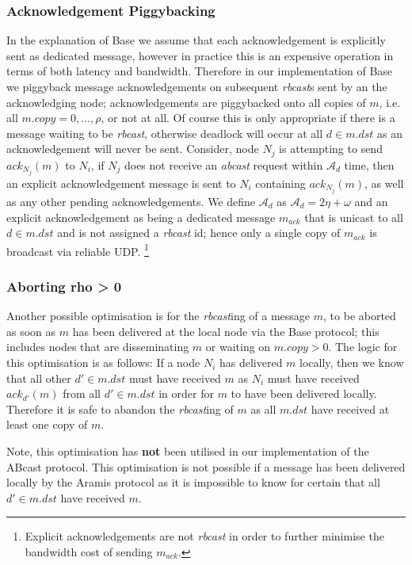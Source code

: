    \subsubsection*{Acknowledgement Piggybacking}\label{ssec:base_ack_piggyback}
    In the explanation of \textsf{Base} we assume that each acknowledgement is explicitly sent as dedicated message, however in practice this is an expensive operation in terms of both latency and bandwidth.  Therefore in our implementation of \textsf{Base} we piggyback message acknowledgements on subsequent \emph{rbcast}s sent by an the acknowledging node; acknowledgements are piggybacked onto all copies of $m$, i.e. all $m.copy =0,\ldots,\rho$, or not at all.  Of course this is only appropriate if there is a message waiting to be \emph{rbcast}, otherwise deadlock will occur at all $d \in m.dst$ as an acknowledgement will never be sent.  Consider, node $N_j$ is attempting to send $ack_{N_j}(m)$ to $N_i$, if $N_j$ does not receive an \emph{abcast} request within $\mathcal{A}_d$ time, then an explicit acknowledgement message is sent to $N_i$ containing $ack_{N_j}(m)$, as well as any other pending acknowledgements.  We define $\mathcal{A}_d$ as $\mathcal{A}_d = 2\eta + \omega$ and an explicit acknowledgement as being a dedicated message $m_{ack}$ that is unicast to all $d \in m.dst$ and is not assigned a \emph{rbcast} id; hence only a single copy of $m_{ack}$ is broadcast via reliable UDP.  \footnote{Explicit acknowledgements are not \emph{rbcast} in order to further minimise the bandwidth cost of sending $m_{ack}$.}
    
    \subsubsection*{Aborting rho > 0}
    Another possible optimisation is for the \emph{rbcast}ing of a message $m$, to be aborted as soon as $m$ has been delivered at the local node via the \textsf{Base} protocol; this includes nodes that are disseminating $m$ or waiting on $m.copy > 0$.  The logic for this optimisation is as follows: If a node $N_i$ has delivered $m$ locally, then we know that all other $d' \in m.dst$ must have received $m$ as $N_i$ must have received $ack_{d'}(m)$ from all $d' \in m.dst$ in order for $m$ to have been delivered locally.  Therefore it is safe to abandon the \emph{rbcast}ing of $m$ as all $m.dst$ have received at least one copy of $m$. 
    
    Note, this optimisation has \textbf{not} been utilised in our implementation of the \textsf{ABcast} protocol.  This optimisation is not possible if a message has been delivered locally by the \textsf{Aramis} protocol as it is impossible to know for certain that all $d' \in m.dst$ have received $m$.  

